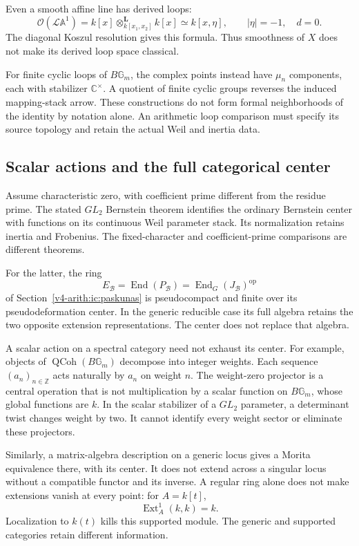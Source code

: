 Even a smooth affine line has derived loops:
\[
 \mathcal O(\mathcal L\mathbb A^1)
 =k[x]\otimes^{\mathbf L}_{k[x_1,x_2]}k[x]
 \simeq k[x,\eta],\qquad |\eta|=-1,\quad d=0.
\]
The diagonal Koszul resolution gives this formula.
Thus smoothness of $X$ does not make its derived loop
space classical.

For finite cyclic loops of $B\mathbb G_m$,
the complex points instead have $\mu_n$ components,
each with stabilizer $\mathbb C^\times$.
A quotient of finite cyclic groups reverses the induced
mapping-stack arrow. These constructions do not form
formal neighborhoods of the identity by notation alone.
An arithmetic loop comparison must specify its source
topology and retain the actual Weil and inertia data.

\subsection{Scalar actions and the full categorical center}

Assume characteristic zero, with coefficient prime different
from the residue prime. The stated $GL_2$ Bernstein theorem
identifies the ordinary Bernstein center with functions on its
continuous Weil parameter stack.
Its normalization retains inertia and Frobenius.
The fixed-character and coefficient-prime comparisons
are different theorems.

For the latter, the ring
\[
 E_{\mathcal B}=\operatorname{End}(P_{\mathcal B})
 =\operatorname{End}_G(J_{\mathcal B})^{\mathrm{op}}
\]
of Section~\ref{v4-arith:ic:paskunas}
is pseudocompact and finite over its pseudodeformation
center. In the generic reducible case its full algebra
retains the two opposite extension representations.
The center does not replace that algebra.

A scalar action on a spectral category need not exhaust
its center. For example, objects of
$\operatorname{QCoh}(B\mathbb G_m)$ decompose into
integer weights. Each sequence $(a_n)_{n\in\mathbb Z}$
acts naturally by $a_n$ on weight $n$.
The weight-zero projector is a central operation
that is not multiplication by a scalar function on
$B\mathbb G_m$, whose global functions are $k$.
In the scalar stabilizer of a $GL_2$ parameter,
a determinant twist changes weight by two.
It cannot identify every weight sector or eliminate
these projectors.

Similarly, a matrix-algebra description on a generic
locus gives a Morita equivalence there, with its center.
It does not extend across a singular locus without
a compatible functor and its inverse.
A regular ring alone does not make extensions vanish
at every point: for $A=k[t]$,
\[
 \operatorname{Ext}^1_A(k,k)=k.
\]
Localization to $k(t)$ kills this supported module.
The generic and supported categories retain different
information.

